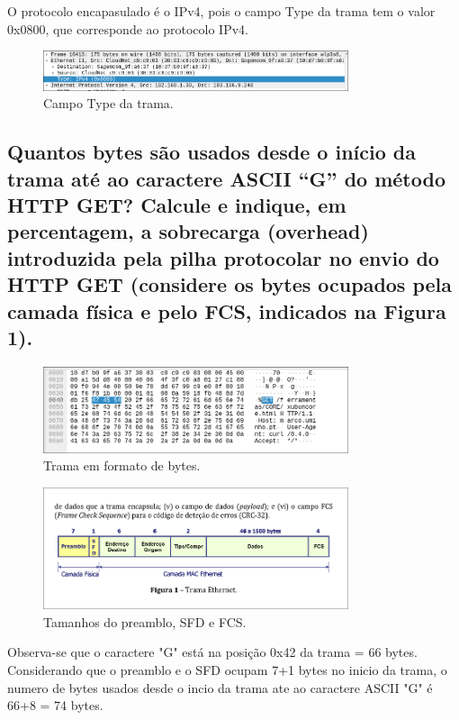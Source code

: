 \documentclass{article}
\begin{document}
O protocolo encapasulado é o IPv4, pois o campo Type da trama tem o valor 0x0800, que corresponde ao protocolo IPv4.

\begin{figure}[h]
    \centering
    \includegraphics[width=0.8\textwidth]{images/type.png}
    \caption{\label{fig:type}Campo Type da trama.}
\end{figure}

\subsection{Quantos bytes são usados desde o início da trama até ao caractere ASCII “G” do
método HTTP GET? Calcule e indique, em percentagem, a sobrecarga (overhead)
introduzida pela pilha protocolar no envio do HTTP GET (considere os bytes
ocupados pela camada física e pelo FCS, indicados na Figura 1).}

\begin{figure}[h]
    \centering
    \includegraphics[width=0.8\textwidth]{images/byte.png}
    \caption{\label{fig:byte}Trama em formato de bytes.}
\end{figure}

\begin{figure}[h]
    \centering
    \includegraphics[width=0.8\textwidth]{images/fcs.png}
    \caption{\label{fig:fcs}Tamanhos do preamblo, SFD e FCS.}
\end{figure}

Observa-se que o caractere "G" está na posição 0x42 da trama = 66 bytes. Considerando que o preamblo e o SFD ocupam 7+1 bytes no inicio da trama, o numero de bytes usados desde o incio da trama ate ao caractere ASCII "G" é 66+8 = 74 bytes.
\end{document}
